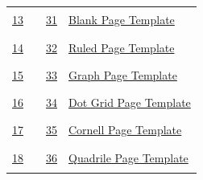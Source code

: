 {\begin{center}
\begin{tabular}{p{0.5in}p{3.5in}p{0.5in}p{3.5in}}
            \hyperlink{s#1p13}{\large 13} & \rule{3in}{0.4pt} & \hyperlink{s#1p31}{\large 31} & \hyperlink{s#1p31}{\large Blank Page Template} \\[0.15in]
            \hyperlink{s#1p14}{\large 14} & \rule{3in}{0.4pt} & \hyperlink{s#1p32}{\large 32} & \hyperlink{s#1p32}{\large Ruled Page Template} \\[0.15in]
            \hyperlink{s#1p15}{\large 15} & \rule{3in}{0.4pt} & \hyperlink{s#1p33}{\large 33} & \hyperlink{s#1p33}{\large Graph Page Template} \\[0.15in]
            \hyperlink{s#1p16}{\large 16} & \rule{3in}{0.4pt} & \hyperlink{s#1p34}{\large 34} & \hyperlink{s#1p34}{\large Dot Grid Page Template} \\[0.15in]
            \hyperlink{s#1p17}{\large 17} & \rule{3in}{0.4pt} & \hyperlink{s#1p35}{\large 35} & \hyperlink{s#1p35}{\large Cornell Page Template} \\[0.15in]
            \hyperlink{s#1p18}{\large 18} & \rule{3in}{0.4pt} & \hyperlink{s#1p36}{\large 36} & \hyperlink{s#1p36}{\large Quadrile Page Template}
        \end{tabular}
    \end{center}
}
